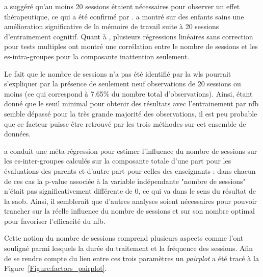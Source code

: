 \citet{Vernon2004} a suggéré qu'au moins 20 sessions étaient nécessaires pour observer un effet thérapeutique, 
ce qui a été confirmé par \citet{Arns2014, Arns2009, Wang2014}. 
\citet{Wang2014} a montré sur des enfants sains une amélioration significative de la mémoire de travail suite à 20 sessions d'entrainement cognitif.
Quant à \citet{Arns2009}, plusieurs régressions linéaires sans correction pour tests multiples ont montré une
corrélation entre le nombre de sessions et les \gls{es}-intra-groupes pour la composante inattention seulement. 

Le fait que le nombre de sessions n'a pas été identifié par la \gls{wls}
pourrait s'expliquer par la présence de seulement neuf observations de 20 sessions ou moins (ce qui correspond à 7.65\% du nombre total d'observations). 
Ainsi, étant donné que le seuil minimal pour obtenir des résultats avec l'entrainement par \gls{nfb} semble dépassé pour la très grande majorité des observations, 
il est peu probable que ce facteur puisse être retrouvé par les trois méthodes sur cet ensemble de données. 

\citet{Cortese2016} a conduit une méta-régression pour estimer l'influence du nombre de sessions
sur les \gls{es}-inter-groupes calculés sur la composante totale d'une part pour les évaluations des parents et d'autre part pour celles des enseignants : 
dans chacun de ces cas la p-value associée à la variable indépendante "nombre de sessions" n'était pas significativement différente de 0, ce qui va dans le sens 
du résultat de la \gls{saob}. Ainsi, il semblerait que d'autres analyses soient nécessaires pour pouvoir trancher sur la réelle influence du nombre de sessions 
et sur son nombre optimal pour favoriser l'efficacité du \gls{nfb}.

Cette notion du nombre de sessions comprend plusieurs aspects comme l'ont souligné \citet{Strehl2014} parmi lesquels la durée du traitement et la fréquence des 
sessions. Afin de se rendre compte du lien entre ces trois paramètres un \textit{pairplot} a été tracé à la Figure~\ref{Figure:factors_pairplot}.

